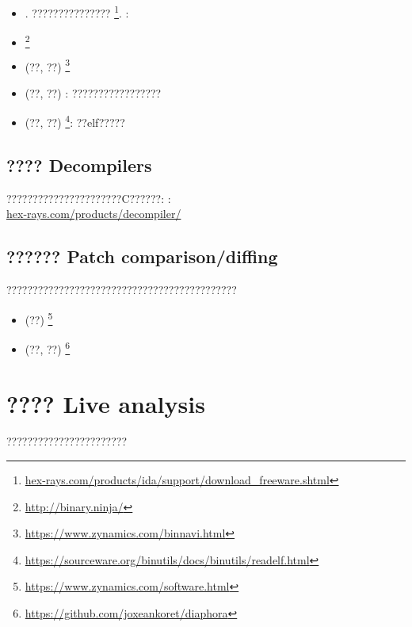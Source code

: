 
\begin{itemize}
\item {}. ???????????????
\footnote{\href{http://go.yurichev.com/17031}{hex-rays.com/products/ida/support/download\_freeware.shtml}}.
\ShortHotKeyCheatsheet: 

\item {}\footnote{\url{http://binary.ninja/}}

\item (??, ??) \footnote{\url{https://www.zynamics.com/binnavi.html}}

\item (??, ??) : ?????????????????

\item (??, ??) \footnote{\url{https://sourceware.org/binutils/docs/binutils/readelf.html}}:
??elf?????
\end{itemize}

\subsection{???? Decompilers}

??????????????????????C??????: :\\
\href{http://go.yurichev.com/17033}{hex-rays.com/products/decompiler/}

\subsection{?????? Patch comparison/diffing}

????????????????????????????????????????????

\begin{itemize}
\item (??) \footnote{\url{https://www.zynamics.com/software.html}}

\item (??, ??) \footnote{\url{https://github.com/joxeankoret/diaphora}}
\end{itemize}

\section{???? Live analysis}

???????????????????????

